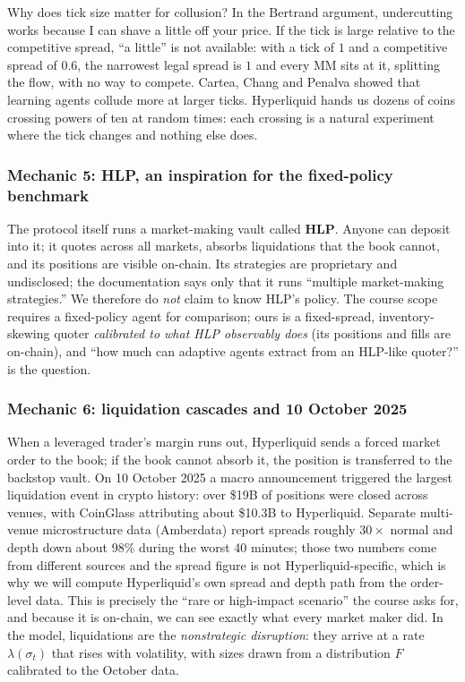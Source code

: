 \documentclass[11pt]{article}
\begin{document}
Why does tick size matter for collusion? In the Bertrand argument, undercutting works because I can shave a little off your price. If the tick is large relative to the competitive spread, ``a little'' is not available: with a tick of $1$ and a competitive spread of $0.6$, the narrowest legal spread is $1$ and every MM sits at it, splitting the flow, with no way to compete. Cartea, Chang and Penalva showed that learning agents collude more at larger ticks. Hyperliquid hands us dozens of coins crossing powers of ten at random times: each crossing is a natural experiment where the tick changes and nothing else does.

\subsubsection{Mechanic 5: HLP, an inspiration for the fixed-policy benchmark}
The protocol itself runs a market-making vault called \textbf{HLP}. Anyone can deposit into it; it quotes across all markets, absorbs liquidations that the book cannot, and its positions are visible on-chain. Its strategies are proprietary and undisclosed; the documentation says only that it runs ``multiple market-making strategies.'' We therefore do \emph{not} claim to know HLP's policy. The course scope requires a fixed-policy agent for comparison; ours is a fixed-spread, inventory-skewing quoter \emph{calibrated to what HLP observably does} (its positions and fills are on-chain), and ``how much can adaptive agents extract from an HLP-like quoter?'' is the question.

\subsubsection{Mechanic 6: liquidation cascades and 10 October 2025}
When a leveraged trader's margin runs out, Hyperliquid sends a forced market order to the book; if the book cannot absorb it, the position is transferred to the backstop vault. On 10 October 2025 a macro announcement triggered the largest liquidation event in crypto history: over \$19B of positions were closed across venues, with CoinGlass attributing about \$10.3B to Hyperliquid. Separate multi-venue microstructure data (Amberdata) report spreads roughly $30\times$ normal and depth down about 98\% during the worst 40 minutes; those two numbers come from different sources and the spread figure is not Hyperliquid-specific, which is why we will compute Hyperliquid's own spread and depth path from the order-level data. This is precisely the ``rare or high-impact scenario'' the course asks for, and because it is on-chain, we can see exactly what every market maker did. In the model, liquidations are the \emph{nonstrategic disruption}: they arrive at a rate $\lambda(\sigma_t)$ that rises with volatility, with sizes drawn from a distribution $F$ calibrated to the October data.
\end{document}
